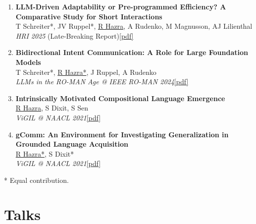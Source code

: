 \documentclass[a4paper,10pt]{article}
\newcommand{\cvlink}[2]{\href{#2}{\small\textcolor{accent}{[#1]}}}
\begin{document}
\begin{enumerate}[leftmargin=1.6em, label={\small W\arabic*.}, itemsep=2pt]
\small{}

  \item \textbf{LLM-Driven Adaptability or Pre-programmed Efficiency? A Comparative Study for Short Interactions}\\
    T Schreiter*, JV Ruppel*, \underline{R Hazra}, A Rudenko, M Magnusson, AJ Lilienthal\\
    \textit{HRI 2025} (Late-Breaking Report)\quad\cvlink{pdf}{https://arxiv.org/pdf/2501.12128}

  \item \textbf{Bidirectional Intent Communication: A Role for Large Foundation Models}\\
    T Schreiter*, \underline{R Hazra*}, J Ruppel, A Rudenko\\
    \textit{LLMs in the RO-MAN Age @ IEEE RO-MAN 2024}\quad\cvlink{pdf}{https://arxiv.org/abs/2408.10589}

  \item \textbf{Intrinsically Motivated Compositional Language Emergence}\\
    \underline{R Hazra}, S Dixit, S Sen\\
    \textit{ViGIL @ NAACL 2021}\quad\cvlink{pdf}{https://arxiv.org/pdf/2012.05011.pdf}

  \item \textbf{gComm: An Environment for Investigating Generalization in Grounded Language Acquisition}\\
    \underline{R Hazra*}, S Dixit*\\
    \textit{ViGIL @ NAACL 2021}\quad\cvlink{pdf}{https://vigilworkshop.github.io/static/papers-2021/16.pdf}

\end{enumerate}

{\small\color{subtle}* Equal contribution.\par}

\section{Talks}
\end{document}
